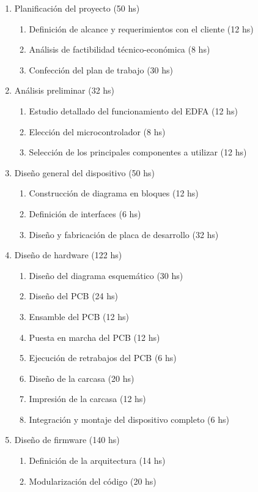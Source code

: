 \documentclass[
11pt, %
]{charter}
\begin{document}
\begin{enumerate}
\item Planificación del proyecto (50 hs)
	\begin{enumerate}
	\item Definición de alcance y requerimientos con el cliente (12 hs)
	\item Análisis de factibilidad técnico-económica (8 hs)
	\item Confección del plan de trabajo (30 hs)
	\end{enumerate}
\item Análisis preliminar (32 hs)
	\begin{enumerate}
	\item Estudio detallado del funcionamiento del EDFA (12 hs)
	\item Elección del microcontrolador (8 hs)
	\item Selección de los principales componentes a utilizar (12 hs)
	\end{enumerate}
\item Diseño general del dispositivo (50 hs)
	\begin{enumerate}
	\item Construcción de diagrama en bloques (12 hs)
	\item Definición de interfaces (6 hs)
	\item Diseño y fabricación de placa de desarrollo (32 hs)
	\end{enumerate}
\item Diseño de hardware (122 hs)
	\begin{enumerate}
	\item Diseño del diagrama esquemático (30 hs)
	\item Diseño del PCB (24 hs)
	\item Ensamble del PCB (12 hs)
	\item Puesta en marcha del PCB (12 hs)
	\item Ejecución de retrabajos del PCB (6 hs)
	\item Diseño de la carcasa (20 hs)
	\item Impresión de la carcasa (12 hs)
	\item Integración y montaje del dispositivo completo (6 hs)
	\end{enumerate}
\item Diseño de firmware (140 hs)
	\begin{enumerate}
	\item Definición de la arquitectura (14 hs)
	\item Modularización del código (20 hs)

\end{enumerate}
\end{enumerate}
\end{document}
